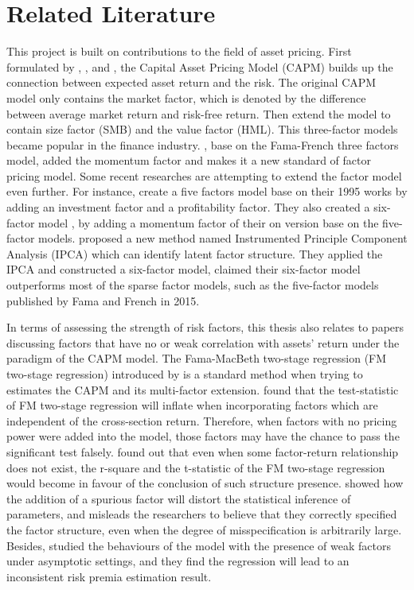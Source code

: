 	\chapter{Related Literature}\label{Literature}
This project is built on contributions to the field of asset pricing.
First formulated by , , and , the Capital Asset Pricing Model (CAPM) builds up the connection between expected asset return and the risk.
The original CAPM model only contains the market factor, which is denoted by the difference between average market return and risk-free return.
Then extend the model to contain size factor (SMB) and the value factor (HML).
This three-factor models became popular in the finance industry.
, base on the Fama-French three factors model, added the momentum factor and makes it a new standard of factor pricing model.
Some recent researches are attempting to extend the factor model even further.
For instance,  create a five factors model base on their 1995 works by adding an investment factor and a profitability factor.
They also created a six-factor model \cite{Fama2018}, by adding a momentum factor of their on version base on the five-factor models.
 proposed a new method named Instrumented Principle Component Analysis (IPCA) which can identify latent factor structure.
They applied the IPCA and constructed a six-factor model, claimed their six-factor model outperforms most of the sparse factor models, such as the five-factor models published by Fama and French in 2015.

In terms of assessing the strength of risk factors, this thesis also relates to papers discussing factors that have no or weak correlation with assets' return under the paradigm of the CAPM model.
The Fama-MacBeth two-stage regression (FM two-stage regression) introduced by  is a standard method when trying to estimates the CAPM and its multi-factor extension. 
 found that the test-statistic of FM two-stage regression will inflate when incorporating factors which are independent of the cross-section return.
Therefore, when factors with no pricing power were added into the model, those factors may have the chance to pass the significant test falsely.
 found out that even when some factor-return relationship does not exist, the r-square and the t-statistic of the FM two-stage regression would become in favour of the conclusion of such structure presence. 
 showed how the addition of a spurious factor will distort the statistical inference of parameters, and misleads the researchers to believe that they correctly specified the factor structure, even when the degree of misspecification is arbitrarily large.
Besides,  studied the behaviours of the model with the presence of weak factors under asymptotic settings, and they find the regression will lead to an inconsistent risk premia estimation result.
	

